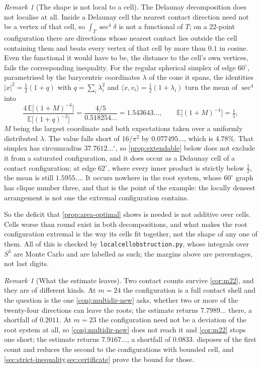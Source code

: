 \documentclass[11pt,reqno]{amsart}
\renewcommand{\_}{\origunderscore\allowbreak}
\numberwithin{equation}{section}
\theoremstyle{plain}
\theoremstyle{definition}
\theoremstyle{remark}
\newtheorem{remark}[thm]{Remark}
\begin{document}
\begin{remark}[The shape is not local to a cell]
The Delaunay decomposition does not localise at all. Inside a Delaunay
cell the nearest contact direction need not be a vertex of that cell, so
$\int_T\sec^4\delta$ is not a functional of $T$; on a $22$-point
configuration there are directions whose nearest contact lies outside
the cell containing them and beats every vertex of that cell by more
than $0.1$ in cosine. Even the functional it would have to be, the
distance to the cell's own vertices, fails the corresponding inequality.
For the regular spherical simplex of edge $60^\circ$, parametrised by
the barycentric coordinates $\lambda$ of the cone it spans, the
identities $|x|^2=\tfrac12(1+q)$ with $q=\sum_i\lambda_i^2$ and
$\langle x,v_i\rangle=\tfrac12(1+\lambda_i)$ turn the mean of $\sec^4$
into
\begin{equation}\label{eq:regular-simplex-mean}
  \frac{4\,\mathbb{E}\bigl[(1+M)^{-4}\bigr]}
       {\mathbb{E}\bigl[(1+q)^{-2}\bigr]}
  =\frac{4/5}{0.518254\ldots}=1.543643\ldots ,
  \qquad
  \mathbb{E}\bigl[(1+M)^{-4}\bigr]=\tfrac15 ,
\end{equation}
$M$ being the largest coordinate and both expectations taken over a
uniformly distributed $\lambda$. The value falls short of $16/\pi^2$ by
$0.077495\ldots$, which is $4.78\%$. That simplex has circumradius
$37.7612\ldots^\circ$, so \cref{prop:extendable} below does not exclude
it from a saturated configuration, and it does occur as a Delaunay cell
of a contact configuration; at edge $62^\circ$, where every inner
product is strictly below $\tfrac12$, the mean is still
$1.5955\ldots$. It occurs nowhere in the root system, whose $60^\circ$
graph has clique number three, and that is the point of the example: the
locally densest arrangement is not one the extremal configuration
contains.

So the deficit that \cref{prop:area-optimal} shows is needed is not
additive over cells. Cells worse than round exist in both
decompositions, and what makes the root configuration extremal is the way its cells fit together, not the shape of any one of them. All
of this is checked by \texttt{local\_cell\_obstruction.py}, whose
integrals over $S^3$ are Monte Carlo and are labelled as such; the
margins above are percentages, not last digits.
\end{remark}

\begin{remark}[What the estimate leaves]\label{rem:what-is-left}
Two contact counts survive \cref{cor:m22}, and they are of different
kinds. At $m=24$ the configuration is a full contact shell and the
question is the one \cref{conj:multidir-new} asks, whether two or more
of the twenty-four directions can leave the roots; the estimate returns
$7.7989\ldots$ there, a shortfall of $0.2011$. At $m=23$ the
configuration need not be a deviation of the root system at all, so
\cref{conj:multidir-new} does not reach it and \cref{cor:m22} stops one
short; the estimate returns $7.9167\ldots$, a shortfall of $0.0833$.
 disposes of the first count and reduces the second to
the configurations with bounded cell, and
\cref{sec:strict-inequality,sec:certificate} prove the bound for those.
\end{remark}
\end{document}
